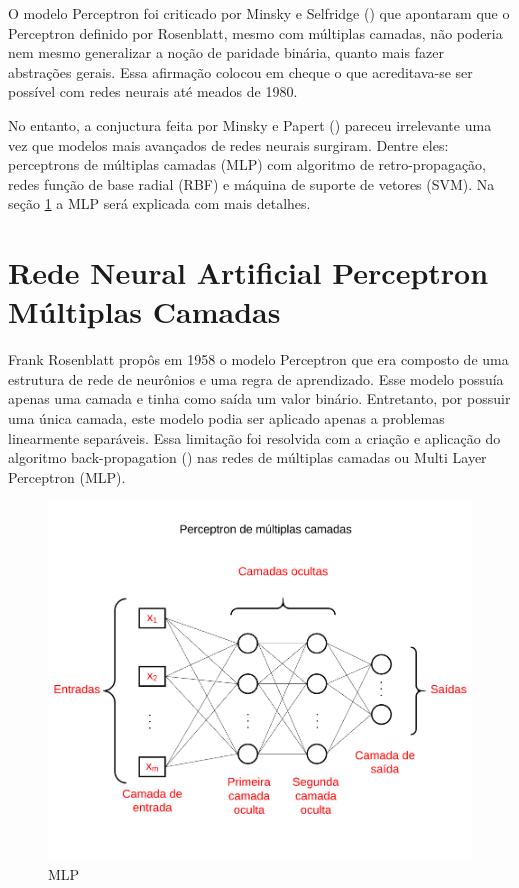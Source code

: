 O modelo Perceptron foi criticado por Minsky e Selfridge (\citeyear{minsky1961steps}) que apontaram que o Perceptron definido por Rosenblatt, mesmo com múltiplas camadas, não poderia nem mesmo generalizar a noção de paridade binária, quanto mais fazer abstrações gerais.
Essa afirmação colocou em cheque o que acreditava-se ser possível com redes neurais até meados de 1980.

No entanto, a conjuctura feita por Minsky e Papert (\citeyear{minsky1969perceptron}) pareceu irrelevante uma vez que modelos mais avançados de redes neurais surgiram. Dentre eles: perceptrons de múltiplas camadas (MLP) com algoritmo de retro-propagação, redes função de base radial (RBF) e máquina de suporte de vetores (SVM). Na seção \ref{sec:redeneuralmlp} a MLP será explicada com mais detalhes.

\section{Rede Neural Artificial Perceptron Múltiplas Camadas}
\label{sec:redeneuralmlp}
Frank Rosenblatt propôs em 1958 o modelo Perceptron que era composto de uma estrutura de rede de neurônios e uma regra de aprendizado. Esse modelo possuía apenas uma camada e tinha como saída um valor
binário. Entretanto, por possuir uma única camada, este modelo podia ser aplicado apenas a problemas linearmente separáveis.
Essa limitação foi resolvida com a criação e aplicação do algoritmo back-propagation (\citeyear{rumelhart1986parallel}) nas redes de múltiplas camadas ou Multi Layer Perceptron (MLP). 

\begin{figure}[H]
    \centering
  \includegraphics[width=350pt]{figuras/MLP.png}
  \caption{MLP}
  \label{fig:MLP}
\end{figure}


